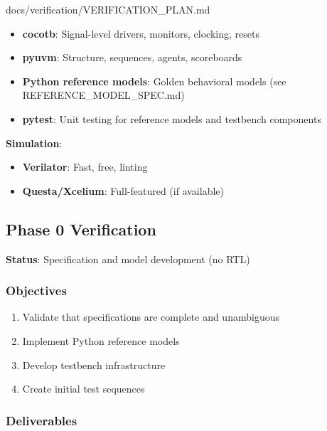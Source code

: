 \begin{relocated}{docs/verification/VERIFICATION_PLAN.md}
\begin{itemize}
\tightlist
\item
  \textbf{cocotb}: Signal-level drivers, monitors, clocking, resets
\item
  \textbf{pyuvm}: Structure, sequences, agents, scoreboards
\item
  \textbf{Python reference models}: Golden behavioral models (see
  REFERENCE\_\allowbreak{}MODEL\_\allowbreak{}SPEC.md)
\item
  \textbf{pytest}: Unit testing for reference models and testbench
  components
\end{itemize}

\textbf{Simulation}:

\begin{itemize}
\tightlist
\item
  \textbf{Verilator}: Fast, free, linting
\item
  \textbf{Questa/\allowbreak{}Xcelium}: Full-featured (if available)
\end{itemize}

\subsection{Phase 0 Verification}\label{ds:ch:verification-plan:phase-0-verification}

\textbf{Status}: Specification and model development (no RTL)

\subsubsection{Objectives}\label{ds:ch:verification-plan:objectives}

\begin{enumerate}
\def\labelenumi{\arabic{enumi}.}
\tightlist
\item
  Validate that specifications are complete and unambiguous
\item
  Implement Python reference models
\item
  Develop testbench infrastructure
\item
  Create initial test sequences
\end{enumerate}

\subsubsection{Deliverables}\label{ds:ch:verification-plan:deliverables}


\end{relocated}
